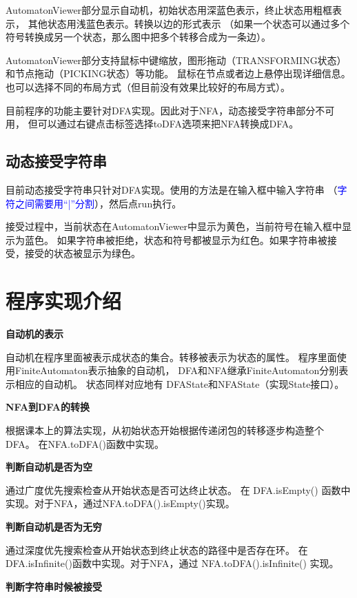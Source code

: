 \documentclass[12pt,a4paper]{article}
\begin{document}
\begin{CJK}{UTF8}{song}
    AutomatonViewer部分显示自动机，初始状态用深蓝色表示，终止状态用粗框表示，
    其他状态用浅蓝色表示。转换以边的形式表示
    （如果一个状态可以通过多个符号转换成另一个状态，那么图中把多个转移合成为一条边）。

    AutomatonViewer部分支持鼠标中键缩放，图形拖动（TRANSFORMING状态）和节点拖动（PICKING状态）等功能。
    鼠标在节点或者边上悬停出现详细信息。
    也可以选择不同的布局方式（但目前没有效果比较好的布局方式）。

    目前程序的功能主要针对DFA实现。因此对于NFA，动态接受字符串部分不可用，
    但可以通过右键点击标签选择toDFA选项来把NFA转换成DFA。

    \subsection{动态接受字符串}
    目前动态接受字符串只针对DFA实现。使用的方法是在输入框中输入字符串
    （\textcolor{blue}{字符之间需要用“|”分割}），然后点run执行。

    接受过程中，当前状态在AutomatonViewer中显示为黄色，当前符号在输入框中显示为蓝色。
    如果字符串被拒绝，状态和符号都被显示为红色。如果字符串被接受，接受的状态被显示为绿色。

    \section{程序实现介绍}

    \textbf{自动机的表示}

    自动机在程序里面被表示成状态的集合。转移被表示为状态的属性。
        程序里面使用FiniteAutomaton表示抽象的自动机，
        DFA和NFA继承FiniteAutomaton分别表示相应的自动机。
        状态同样对应地有 DFAState和NFAState（实现State接口）。

    \textbf{NFA到DFA的转换}

    根据课本上的算法实现，从初始状态开始根据传递闭包的转移逐步构造整个DFA。
        在NFA.toDFA()函数中实现。

    \textbf{判断自动机是否为空}

    通过广度优先搜索检查从开始状态是否可达终止状态。
        在 DFA.isEmpty() 函数中实现。对于NFA，通过NFA.toDFA().isEmpty()实现。

    \textbf{判断自动机是否为无穷}

    通过深度优先搜索检查从开始状态到终止状态的路径中是否存在环。
        在DFA.isInfinite()函数中实现。对于NFA，通过 NFA.toDFA().isInfinite() 实现。

    \textbf{判断字符串时候被接受}


\end{CJK}
\end{document}
